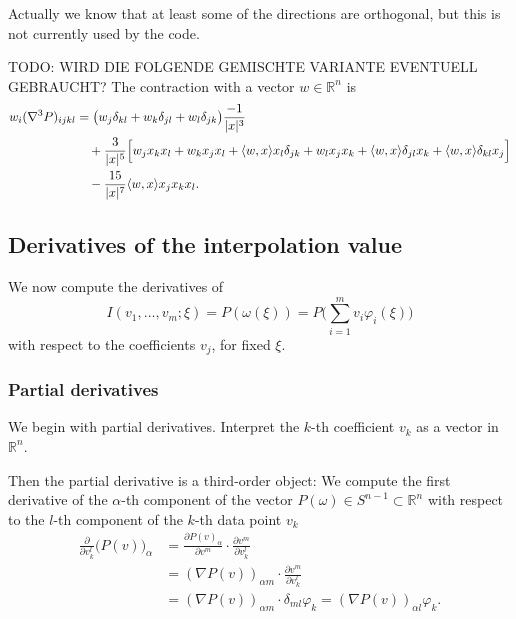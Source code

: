 \documentclass[a4paper]{article}
\newcommand{\R}{\mathbb R}
\DeclarePairedDelimiter{\abs}{\lvert}{\rvert}
\begin{document}
Actually we know that at least some of the directions are orthogonal, but this is not
currently used by the code.

TODO: WIRD DIE FOLGENDE GEMISCHTE VARIANTE EVENTUELL GEBRAUCHT?
The contraction with a vector $w \in \R^n$ is
\begin{align*}
 w_i (\nabla^3 P)_{ijkl}
 & =
 \big( w_j \delta_{kl} + w_k \delta_{jl} + w_l \delta_{jk} \big) \frac{-1}{\abs{x}^3}
 \\
 & \quad
 + \frac{3}{\abs{x}^5}
 \Big[ w_j x_k x_l + w_k x_j x_l + \langle w,x \rangle x_l \delta_{jk} + w_l x_j x_k
    + \langle w,x \rangle \delta_{jl} x_k + \langle w,x \rangle \delta_{kl} x_j \Big]
 \\
 & \quad
 - \frac{15}{\abs{x}^7} \langle w,x \rangle x_j x_k x_l.
\end{align*}



\subsection{Derivatives of the interpolation value}

We now compute the derivatives of
\begin{equation*}
 I(v_1,\dots,v_m; \xi)
 =
 P(\omega(\xi))
 =
 P\Big(\sum_{i=1}^m v_i \varphi_i(\xi)\Big)
\end{equation*}
with respect to the coefficients $v_j$, for fixed $\xi$.

\subsubsection{Partial derivatives}

We begin with partial derivatives.  Interpret the $k$-th coefficient $v_k$
as a vector in $\R^n$.

Then the partial derivative is a third-order object: We compute the first derivative
of the $\alpha$-th component of the vector $P(\omega) \in S^{n-1} \subset \R^n$
with respect to the $l$-th component of the $k$-th data point $v_k$
\begin{align*}
 \frac{\partial}{\partial v_k^l} \big( P (v) \big)_\alpha
 & =
 \frac{\partial P(v)_\alpha}{\partial v^m} \cdot \frac{\partial v^m}{\partial v_k^l}
 \\
 & =
 (\nabla P(v))_{\alpha m} \cdot \frac{\partial v^m}{\partial v_k^l}
 \\
 & =
 (\nabla P(v))_{\alpha m} \cdot \delta_{ml} \varphi_k
 =
 (\nabla P(v))_{\alpha l} \varphi_k.
\end{align*}
\end{document}
